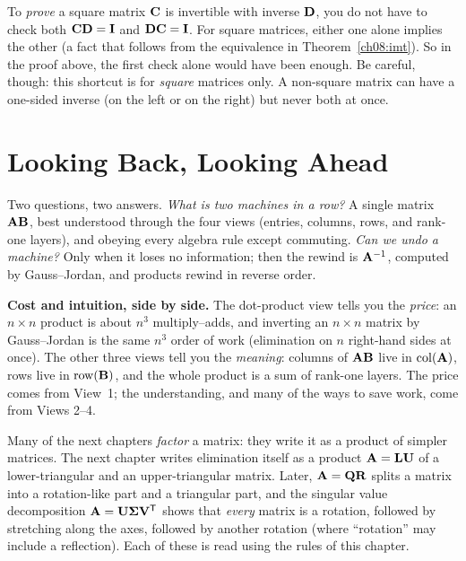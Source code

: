 \begin{remark}
To \emph{prove} a square matrix $\mathbf{C}$ is invertible with inverse $\mathbf{D}$, you do
not have to check both $\mathbf{C}\mathbf{D}=\mathbf{I}$ and $\mathbf{D}\mathbf{C}=\mathbf{I}$. For square
matrices, either one alone implies the other (a fact that follows from the equivalence in
Theorem~\ref{ch08:imt}). So in the proof above, the first check alone would have been
enough. Be careful, though: this shortcut is for \emph{square} matrices only. A
non-square matrix can have a one-sided inverse (on the left or on the right) but never
both at once.
\end{remark}

\section*{Looking Back, Looking Ahead}

Two questions, two answers. \emph{What is two machines in a row?} A single matrix
$\mathbf{A}\mathbf{B}$, best understood through the four views (entries, columns, rows, and
rank-one layers), and obeying every algebra rule except commuting. \emph{Can we undo a
machine?} Only when it loses no information; then the rewind is $\mathbf{A}^{-1}$, computed
by Gauss--Jordan, and products rewind in reverse order.

\begin{focusbox}
\textbf{Cost and intuition, side by side.} The dot-product view tells you the
\emph{price}: an $n\times n$ product is about $n^3$ multiply--adds, and inverting an
$n\times n$ matrix by Gauss--Jordan is the same $n^3$ order of work (elimination on $n$
right-hand sides at once). The other three views tell you the \emph{meaning}: columns of
$\mathbf{A}\mathbf{B}$ live in $\operatorname{col}(\mathbf{A})$, rows live in $\operatorname{row}(\mathbf{B})$, and the whole
product is a sum of rank-one layers. The price comes from View~1; the understanding,
and many of the ways to save work, come from Views 2--4.
\end{focusbox}

Many of the next chapters \emph{factor} a matrix: they write it as a product of
simpler matrices. The next chapter writes elimination itself as a product
$\mathbf{A} = \mathbf{L}\mathbf{U}$ of a lower-triangular and an upper-triangular matrix.
Later, $\mathbf{A} = \mathbf{Q}\mathbf{R}$ splits a matrix into a rotation-like part and a
triangular part, and the singular value decomposition
$\mathbf{A} = \mathbf{U}\mathbf{\Sigma}\mathbf{V}^{\mathsf{T}}$ shows that \emph{every} matrix is a rotation,
followed by stretching along the axes, followed by another rotation (where
``rotation'' may include a reflection). Each of these is read using the rules of
this chapter.

